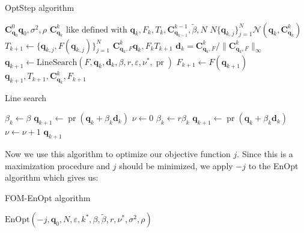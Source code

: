 \begin{algorithm}[H]%
\caption{OptStep algorithm}
\begin{algorithmic}[1]
\State {}$\mathbf{C}_{\mathbf{q}_0}^0$$\mathbf{q}_0,\sigma^2,\rho$
\Else
\State {}$\mathbf{C}_{\mathbf{q}_{k}}^{k}\text{ like defined with }\mathbf{q}_k,F_k,T_k,\mathbf{C}_{\mathbf{q}_{k-1}}^{k-1},\tilde{\beta},N$
\EndIf
\State {}$N$$\{\mathbf{q}_{k,j}\}_{j=1}^N$$\mathcal{N}(\mathbf{q}_{k},\mathbf{C}_{\mathbf{q}_{k}}^{k})$
\State $T_{k+1}\gets\{\mathbf{q}_{k,j},F(\mathbf{q}_{k,j})\}_{j=1}^N$
\State {}$\mathbf{C}_{\mathbf{q}_{k},F}^{k}$$\mathbf{q}_k,F_k$$T_{k+1}$
\State {}$\mathbf{d}_k=\mathbf{C}_{\mathbf{q}_{k},F}^{k}/\|\mathbf{C}_{\mathbf{q}_{k},F}^{k}\|_\infty$
\State $\mathbf{q}_{k+1}\gets\mathrm{LineSearch}(F,\mathbf{q}_k,\mathbf{d}_k,\beta,r,\varepsilon,\nu^*,\operatorname{pr})$
\State $F_{k+1}\gets F(\mathbf{q}_{k+1})$
\State \Return $\mathbf{q}_{k+1},T_{k+1},\mathbf{C}_{\mathbf{q}_k}^k,F_{k+1}$
\EndProcedure
\end{algorithmic}
\end{algorithm}
\begin{algorithm}[H]%
\caption{Line search}
\begin{algorithmic}[1]
\State $\beta_k \gets \beta$
\State $\mathbf{q}_{k+1} \gets \operatorname{pr}(\mathbf{q}_k+\beta_k\mathbf{d}_k)$
\State $\nu \gets 0$
\State $\beta_k \gets r\beta_k$
\State $\mathbf{q}_{k+1} \gets \operatorname{pr}(\mathbf{q}_k+\beta_k\mathbf{d}_k)$
\State $\nu \gets \nu+1$
\EndWhile
\Return $\mathbf{q}_{k+1}$
\EndProcedure
\end{algorithmic}
\end{algorithm}
Now we use this algorithm to optimize our objective function $j$. Since this is a maximization procedure and $j$ should be minimized, we apply $-j$ to the EnOpt algorithm which gives us:
\begin{algorithm}[H]%
\caption{FOM-EnOpt algorithm}
\begin{algorithmic}[1]
\State \Return $\mathrm{EnOpt}(-j,\mathbf{q}_0,N,\varepsilon,k^*,\beta,\tilde{\beta},r,\nu^*,\sigma^2,\rho)$
\EndProcedure
\end{algorithmic}
\end{algorithm}